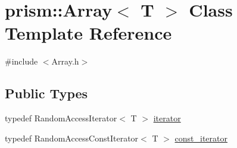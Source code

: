 \hypertarget{classprism_1_1_array}{}\section{prism\+:\+:Array$<$ T $>$ Class Template Reference}
\label{classprism_1_1_array}


{\ttfamily \#include $<$Array.\+h$>$}

\subsection*{Public Types}
\begin{DoxyCompactItemize}
\item 
typedef Random\+Access\+Iterator$<$ T $>$ \hyperlink{classprism_1_1_array_a6814c2af67e8b3fc48b02319f5e63d50}{iterator}
\item 
typedef Random\+Access\+Const\+Iterator$<$ T $>$ \hyperlink{classprism_1_1_array_ab78c83a88959a72d59e5f930540be94a}{const\+\_\+iterator}
\end{DoxyCompactItemize}
